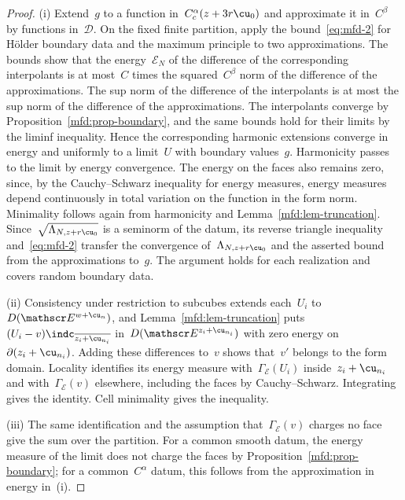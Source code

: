 \documentclass[11pt]{amsart}
\begin{document}
\begin{proof}
(i) Extend~$g$ to a function in~$C_c^\alpha(z+3r\cu_0)$ and approximate it in~$C^\beta$ by functions in~$\mathcal D$. On the fixed finite partition, apply the bound~\eqref{eq:mfd-2} for H\"older boundary data and the maximum principle to two approximations. The bounds show that the energy~$\mathscr E_N$ of the difference of the corresponding interpolants is at most~$C$ times the squared~$C^\beta$ norm of the difference of the approximations. The sup norm of the difference of the interpolants is at most the sup norm of the difference of the approximations. The interpolants converge by Proposition~\ref{mfd:prop-boundary}, and the same bounds hold for their limits by the liminf inequality. Hence the corresponding harmonic extensions converge in energy and uniformly to a limit~$U$ with boundary values~$g$. Harmonicity passes to the limit by energy convergence. The energy on the faces also remains zero, since, by the Cauchy--Schwarz inequality for energy measures, energy measures depend continuously in total variation on the function in the form norm. Minimality follows again from harmonicity and Lemma~\ref{mfd:lem-truncation}. Since~$\sqrt{\Lambda_{N,z+r\cu_0}}$ is a seminorm of the datum, its reverse triangle inequality and~\eqref{eq:mfd-2} transfer the convergence of~$\Lambda_{N,z+r\cu_0}$ and the asserted bound from the approximations to~$g$. The argument holds for each realization and covers random boundary data.

\smallskip

(ii) Consistency under restriction to subcubes extends each~$U_i$ to~$D(\mathscr E^{w+\cu_n})$, and Lemma~\ref{mfd:lem-truncation} puts~$(U_i-v)\indc_{\overline{z_i+\cu_{n_i}}}$ in~$D(\mathscr E^{z_i+\cu_{n_i}})$ with zero energy on~$\partial(z_i+\cu_{n_i})$. Adding these differences to~$v$ shows that~$v'$ belongs to the form domain. Locality identifies its energy measure with~$\Gamma_{\mathscr E}(U_i)$ inside~$z_i+\cu_{n_i}$ and with~$\Gamma_{\mathscr E}(v)$ elsewhere, including the faces by Cauchy--Schwarz. Integrating gives the identity. Cell minimality gives the inequality.

\smallskip

(iii) The same identification and the assumption that~$\Gamma_{\mathscr E}(v)$ charges no face give the sum over the partition. For a common smooth datum, the energy measure of the limit does not charge the faces by Proposition~\ref{mfd:prop-boundary}; for a common~$C^\alpha$ datum, this follows from the approximation in energy in~(i).
\end{proof}
\end{document}
